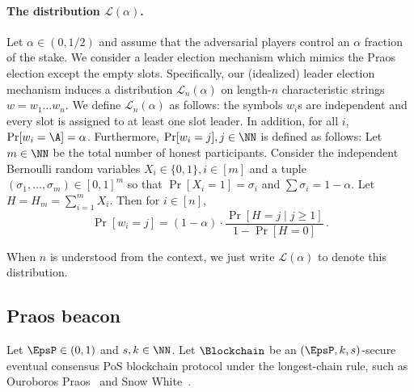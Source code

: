 \paragraph{The distribution $\mathcal{L}(\alpha)$.}
Let $\alpha \in (0, 1/2)$ 
and assume that the adversarial players control an $\alpha$ 
fraction of the stake. 
We consider a leader election mechanism 
which mimics the Praos election except the empty slots. 
Specifically, 
our (idealized) leader election mechanism 
induces 
a distribution $\mathcal{L}_n(\alpha)$ 
on length-$n$ characteristic strings $w = w_1 \ldots w_n$. 
We define $\mathcal{L}_n(\alpha)$ as follows: 
the symbols $w_i$s are independent 
and 
every slot is assigned to at least one slot leader. 
In addition, for all $i$, $\Pr[w_i = \A] = \alpha$.
Furthermore, $\Pr[w_i = j], j \in \NN$ is defined as follows: 
Let $m \in \NN$ be the total number of honest participants. 
Consider the independent Bernoulli random variables $X_i \in \{0, 1\}, i \in [m]$ 
and a tuple $(\sigma_1, \ldots, \sigma_m) \in [0,1]^m$ 
so that $\Pr[X_i = 1] = \sigma_i$ 
and $\sum \sigma_i = 1 - \alpha$. 
Let $H = H_m = \sum_{i =1}^m X_i$. 
Then for $i \in [n]$, 
$$
  \Pr[w_i = j] = (1-\alpha)\cdot
    \frac{\Pr[H = j \mid j \geq 1]}{1 - \Pr[H = 0]}
    \,.
$$

When $n$ is understood from the context, 
we just write $\mathcal{L}(\alpha)$ to denote this distribution.





\subsection{Praos beacon}
Let $\EpsP \in (0,1)$ and $s, k \in \NN$. 
Let $\Blockchain$ be an $(\EpsP, k, s)$-secure eventual consensus PoS blockchain protocol 
under the longest-chain rule, such as 
Ouroboros Praos~\cite{Praos} and Snow White~\cite{SnowWhite}. 






